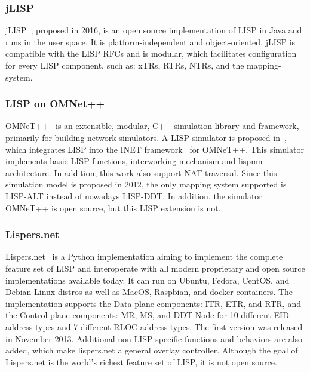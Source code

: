 \subsubsection{jLISP}
\label{subsubsec:implementation_jLISP}
jLISP~\cite{stockmayer2016jlisp}, proposed in 2016, is an open source implementation of LISP in Java and runs in the user space. It is platform-independent and object-oriented. jLISP is compatible with the LISP RFCs and is modular, which facilitates configuration for every LISP component, such as: xTRs, RTRs, NTRs, and the mapping-system.

\subsubsection{LISP on OMNet++}
\label{subsubsec:implementation_OMNet}
OMNeT++~\cite{omnetpp} is an extensible, modular, C++ simulation library and framework, primarily for building network simulators. A LISP simulator is proposed in~\cite{klein2012integration}, which integrates LISP into the INET framework~\cite{INET} for OMNeT++. This simulator implements basic LISP functions, interworking mechanism and \acrshort{lispmn} architecture. In addition, this work also support NAT traversal. Since this simulation model is proposed in 2012, the only mapping system supported is LISP-ALT instead of nowadays LISP-DDT. In addition, the simulator OMNeT++ is open source, but this LISP extension is not. %

\subsubsection{Lispers.net}
\label{subsubsec:implementation_lispers}
Lispers.net~\cite{lispers} is a Python implementation aiming to implement the complete feature set of LISP and interoperate with all modern proprietary and open source implementations available today. It can run on Ubuntu, Fedora, CentOS, and Debian Linux distros as well as MacOS, Raspbian, and docker containers. The implementation supports the Data-plane components: ITR, ETR, and RTR, and the Control-plane components: MR, MS, and DDT-Node for 10 different EID address types and 7 different RLOC address types. The first version was released in November 2013. Additional non-LISP-specific functions and behaviors are also added, which make lispers.net a general overlay controller. %
Although the goal of Lispers.net is the world's richest feature set of LISP, it is not open source.

